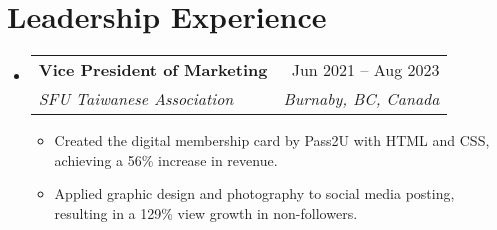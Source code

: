 \documentclass[letterpaper,11pt]{article}
\makeatletter
\newcommand{\resumeItem}[1]{
  \item\small{
    {#1 \vspace{-2pt}}
  }
}
\newcommand{\resumeSubheading}[4]{
  \vspace{-2pt}\item
    \begin{tabular*}{0.97\textwidth}[t]{l@{\extracolsep{\fill}}r}
      \textbf{#1} & #2 \\
      \textit{\small#3} & \textit{\small #4} \\
    \end{tabular*}\vspace{-7pt}
}
\newcommand{\resumeSubHeadingListStart}{\begin{itemize}[leftmargin=0.15in, label={}]}
\newcommand{\resumeSubHeadingListEnd}{\end{itemize}}
\newcommand{\resumeItemListStart}{\begin{itemize}}
\newcommand{\resumeItemListEnd}{\end{itemize}\vspace{-5pt}}
\makeatother
\begin{document}
%


\section{Leadership Experience}
  \resumeSubHeadingListStart
    \resumeSubheading
      {Vice President of Marketing}{Jun 2021 -- Aug 2023}
      {SFU Taiwanese Association}{Burnaby, BC, Canada}
      \resumeItemListStart
        \resumeItem{Created the digital membership card by Pass2U with HTML and CSS, achieving a 56\% increase in revenue.}
        \resumeItem{Applied graphic design and photography to social media posting, resulting in a 129\% view growth in non-followers.}
      \resumeItemListEnd
  \resumeSubHeadingListEnd

\end{document}
